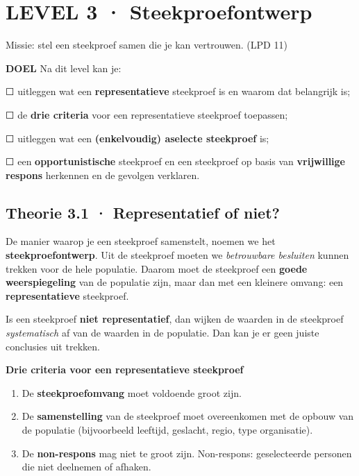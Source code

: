\section{LEVEL 3 · Steekproefontwerp}

\begin{missie}
Missie: stel een steekproef samen die je kan vertrouwen. (LPD 11)
\end{missie}

\begin{doel}
\textbf{DOEL} \quad Na dit level kan je:

☐ uitleggen wat een \textbf{representatieve} steekproef is en waarom dat belangrijk is;

☐ de \textbf{drie criteria} voor een representatieve steekproef toepassen;

☐ uitleggen wat een \textbf{(enkelvoudig) aselecte steekproef} is;

☐ een \textbf{opportunistische} steekproef en een steekproef op basis van \textbf{vrijwillige respons} herkennen en de gevolgen verklaren.
\end{doel}

\subsection*{Theorie 3.1 · Representatief of niet?}

\begin{theorie}
De manier waarop je een steekproef samenstelt, noemen we het \textbf{steekproefontwerp}. Uit de steekproef moeten we \emph{betrouwbare besluiten} kunnen trekken voor de hele populatie. Daarom moet de steekproef een \textbf{goede weerspiegeling} van de populatie zijn, maar dan met een kleinere omvang: een \textbf{representatieve} steekproef.

Is een steekproef \textbf{niet representatief}, dan wijken de waarden in de steekproef \emph{systematisch} af van de waarden in de populatie. Dan kan je er geen juiste conclusies uit trekken.
\end{theorie}

\begin{theorie}
\textbf{Drie criteria voor een representatieve steekproef}

\begin{enumerate}
\item De \textbf{steekproefomvang} moet voldoende groot zijn.
\item De \textbf{samenstelling} van de steekproef moet overeenkomen met de opbouw van de populatie (bijvoorbeeld leeftijd, geslacht, regio, type organisatie).
\item De \textbf{non-respons} mag niet te groot zijn. Non-respons: geselecteerde personen die niet deelnemen of afhaken.
\end{enumerate}
\end{theorie}

